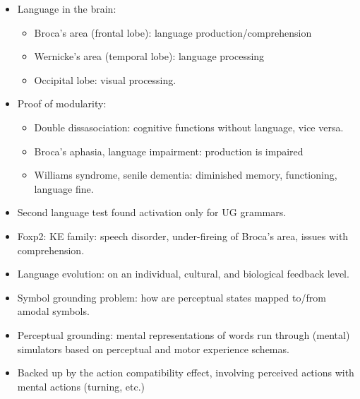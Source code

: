 \documentclass[11pt]{article}
\newenvironment{itemise}{
\begin{itemize}
  \setlength{\itemsep}{1pt}
  \setlength{\parskip}{0pt}
  \setlength{\parsep}{0pt}
}{\end{itemize}}
\begin{document}
\begin{itemise}
\begin{itemise}
 \begin{itemise}
 \item domain specific, innately specified, informationally encapsulated, fast, hardwired, autonomous, not assembled.
 \item Three types: transducers (physical to neural), input system (modular), central system.
 \end{itemise}
 \end{itemise}
 \item Language in the brain:
 \begin{itemise}
 \item Broca's area (frontal lobe): language production/comprehension
 \item Wernicke's area (temporal lobe): language processing
 \item Occipital lobe: visual processing.
 \end{itemise}
 \item Proof of modularity:
  \begin{itemise}
  \item Double dissasociation: cognitive functions without language, vice versa.
  \item Broca's aphasia, language impairment: production is impaired
  \item Williams syndrome, senile dementia: diminished memory, functioning, language fine.
 \end{itemise}
 \item Second language test found activation only for UG grammars.
 \item Foxp2: KE family: speech disorder, under-fireing of Broca's area, issues with comprehension.
 \item Language evolution: on an individual, cultural, and biological feedback level.
 \item Symbol grounding problem: how are perceptual states mapped to/from amodal symbols. 
 \item Perceptual grounding: mental representations of words run through (mental) simulators based on perceptual and motor experience schemas. 
 \item Backed up by the action compatibility effect, involving perceived actions with mental actions (turning, etc.)
 \end{itemise}
\end{document}
